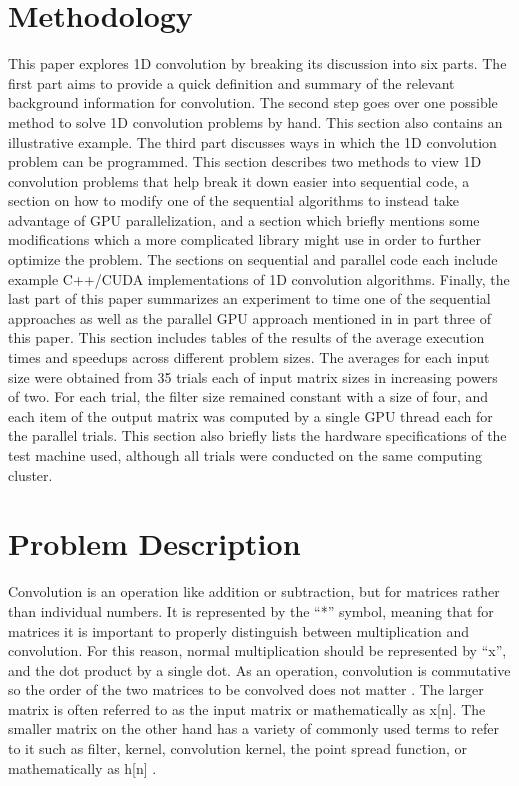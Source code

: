 \documentclass{article}
\begin{document}
\section{Methodology}
This paper explores 1D convolution by breaking its discussion into six parts. The first part aims to provide a quick definition and summary of the relevant background information for convolution. The second step goes over one possible method to solve 1D convolution problems by hand. This section also contains an illustrative example. The third part discusses ways in which the 1D convolution problem can be programmed. This section describes two methods to view 1D convolution problems that help break it down easier into sequential code, a section on how to modify one of the sequential algorithms to instead take advantage of GPU parallelization, and a section which briefly mentions some modifications which a more complicated library might use in order to further optimize the problem. The sections on sequential and parallel code each include example C++/CUDA implementations of 1D convolution algorithms. Finally, the last part of this paper summarizes an experiment to time one of the sequential approaches as well as the parallel GPU approach mentioned in in part three of this paper. This section includes tables of the results of the average execution times and speedups across different problem sizes. The averages for each input size were obtained from 35 trials each of input matrix sizes in increasing powers of two. For each trial, the filter size remained constant with a size of four, and each item of the output matrix was computed by a single GPU thread each for the parallel trials. This section also briefly lists the hardware specifications of the test machine used, although all trials were conducted on the same computing cluster.

\section{Problem Description}
Convolution is an operation like addition or subtraction, but for matrices rather than individual numbers. It is represented by the ``*'' symbol, meaning that for matrices it is important to properly distinguish between multiplication and convolution. For this reason, normal multiplication should be represented by ``x'', and the dot product by a single dot. As an operation, convolution is commutative so the order of the two matrices to be convolved does not matter . The larger matrix is often referred to as the input matrix or mathematically as x[n]. The smaller matrix on the other hand has a variety of commonly used terms to refer to it such as filter, kernel, convolution kernel, the point spread function, or mathematically as h[n] . 
\end{document}
